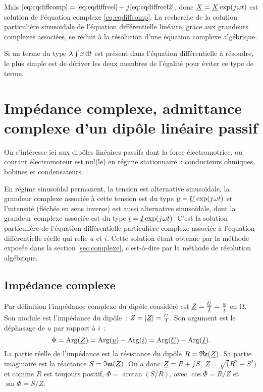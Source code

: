        Mais \(\eqref{eq:eqdiffcomp} = \eqref{eq:eqdiffreel} + {j\mkern1mu} \eqref{eq:eqdiffreel2}\), donc \(\underline{X} = \underline{X} \exp({j\mkern1mu}\omega t)\) est solution de l'équation complexe \eqref{eq:eqdiffcomp}. La recherche de la solution particulière sinusoïdale de l'équation différentielle linéaire, grâce aux grandeurs complexes associées, se réduit à la résolution d'une équation complexe algébrique.

        Si un terme du type \(\lambda \int x \mathop{}\mathopen{}\mathrm{d}{}t\) est présent dans l'équation différentielle à résoudre, le plus simple est de dériver les deux membres de l'égalité pour éviter ce type de terme.
\section{Impédance complexe, admittance complexe d'un dipôle linéaire passif}
    On s'intéresse ici aux dipôles linéaires passifs dont la force électromotrice, ou courant électromoteur est nul(le) en régime stationnaire~: conducteurs ohmiques, bobines et condensateurs.

    En régime sinusoïdal permanent, la tension est alternative sinusoïdale, la grandeur complexe associée à cette tension est du type \(\underline{u} = \underline{U} \exp({j\mkern1mu}\omega t)\) et l'intensité (fléchée en sens inverse) est aussi alternative sinusoïdale, dont la grandeur complexe associée est du type \(\underline{i} = \underline{I} \exp({j\mkern1mu}\omega t)\). C'est la solution particulière de l'équation différentielle particulière complexe associée à l'équation différentielle réelle qui relie \(u\) et \(i\). Cette solution étant obtenue par la méthode exposée dans la section \ref{sec:complexe}, c'est-à-dire par la méthode de résolution algébrique.
    \subsection{Impédance complexe}
        Par définition l'impédance complexe du dipôle considéré est \(\underline{Z} = \frac{\underline{U}}{\underline{I}}=\frac{\underline{u}}{\underline{i}}\) en \(\si{\ohm}\). Son module est l'impédance du dipôle~: \(Z = \left\lvert\underline{Z}\right\rvert = \frac{U}{I}\). Son argument est le déphasage de \(u\) par rapport à \(i\)~:
        \begin{equation}
            \Phi = \operatorname{Arg}(\underline{Z}) = \operatorname{Arg}(\underline{u}) - \operatorname{Arg}(\underline{i}) = \operatorname{Arg}(\underline{U}) - \operatorname{Arg}(\underline{I}).
        \end{equation}
        La partie réelle de l'impédance est la résistance du dipôle \(R = \mathfrak{Re}(\underline{Z})\). Sa partie imaginaire est la réactance \(S=\mathfrak{Im}(\underline{Z})\). On a donc \(\underline{Z} = R + {j\mkern1mu} S\), \(Z = \sqrt(R^2+S^2)\) et comme \(R\) est toujours positif, \(\Phi = \arctan(S/R)\), avec \(\cos\Phi = R/Z\) et \(\sin\Phi=S/Z\).
